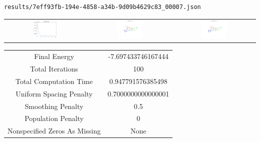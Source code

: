 \documentclass{report}
\begin{document}
\begin{lstlisting}
results/7eff93fb-194e-4858-a34b-9d09b4629c83_00007.json
\end{lstlisting}
\begin{tabular}{ccc}
\includegraphics[width=0.32\textwidth]{7eff93fb-194e-4858-a34b-9d09b4629c83_00007_energies.png}
&
\includegraphics[width=0.32\textwidth]{7eff93fb-194e-4858-a34b-9d09b4629c83_00007_initial_curves.png}
&
\includegraphics[width=0.32\textwidth]{7eff93fb-194e-4858-a34b-9d09b4629c83_00007_estimated_curves.png}
\\
\end{tabular}
\begin{tabular}{cc}
Final Energy&-7.697433746167444\\
Total Iterations&100\\
Total Computation Time&0.947791576385498\\
Uniform Spacing Penalty&0.7000000000000001\\
Smoothing Penalty&0.5\\
Population Penalty&0\\
Nonspecified Zeros As Missing&None\\
\end{tabular}
\end{document}
